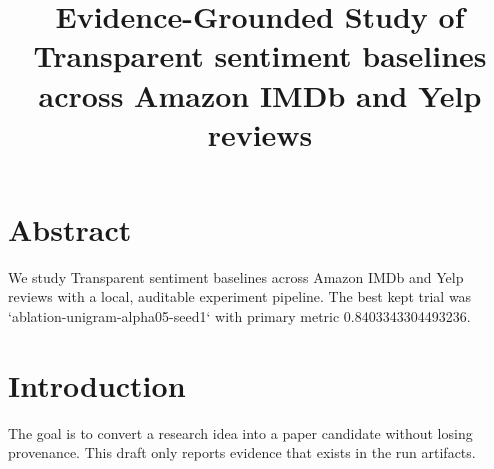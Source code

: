 \documentclass{article}
\begin{document}
\title{Evidence-Grounded Study of Transparent sentiment baselines across Amazon IMDb and Yelp reviews}
\maketitle

\section{Abstract}
We study Transparent sentiment baselines across Amazon IMDb and Yelp reviews with a local, auditable experiment pipeline. The best kept trial was `ablation-unigram-alpha05-seed1` with primary metric 0.8403343304493236.

\section{Introduction}
The goal is to convert a research idea into a paper candidate without losing provenance.
This draft only reports evidence that exists in the run artifacts.
\end{document}
